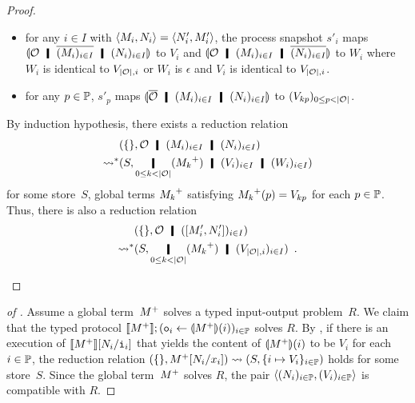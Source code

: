 \begin{proof}
\begin{description}
\begin{itemize}
	   \item
		 for any $i\in I$ with $\langle{M_i,N_i}\rangle = \langle{N'_i,
		 M'_i}\rangle$, the process snapshot
		 $s'_i$ maps
		 $\semoi{\hypert\hmid \overline{(M_i)_{i\in I}}\hmid
		 (N_i)_{i\in I}}$ to $V_i$ and
		 $\semoi{\hypert\hmid (M_i)_{i\in I}\hmid
		 \overline{(N_i)_{i\in I}}}$ to $W_i$ where
		 $W_i$ is identical to $V_{|\mathcal{O}|,i}$ or
		 $W_i$ is $\epsilon$ and $V_i$ is identical to
		 $V_{|\mathcal{O}|,i}$.
	   \item for any $p\in\mathbb{P}$,
		 $s'_p$ maps $\semoi{\overline{\hypert}\hmid (M_i)_{i\in
		 I}\hmid (N_i)_{i\in I}}$ to
		 $(V_{kp})_{0\le p < |\mathcal{O}|}$.
	  \end{itemize}
	  By induction hypothesis, there exists a reduction relation
	  \begin{align*}
	   &\concreteconf{\{\}}{\hypert\hmid (M_i)_{i\in I}\hmid
	   (N_i)_{i\in I}}
	   \\
	   \reduction&\concreteconf{S}{\operatorname*{\hmid}_{0\le k <
	   |\hypert|}
	   (\m{M_k})\hmid (V_i)_{i\in I}\hmid (W_i)_{i\in I}}
	  \end{align*}
	  for some store~$S$, global terms ${M_k}^+$ satisfying
	  ${M_k}^+(p) = V_{kp}$ for each $p\in \mathbb{P}$.
	  Thus, there is also a reduction relation
	  \begin{align*}
	   &\concreteconf{\{\}}{\hypert\hmid (\cotuple{M'_i,N'_i})_{i\in
	   I}}
	   \\
	   \reduction&\concreteconf{S}{\operatorname*{\hmid}_{0\le k <
	   |\hypert|}(\m{M_k})\hmid (V_{|\hypert|,i})_{i\in I}}\enspace.
	  \end{align*}
    \end{description}
   \end{proof}

 \begin{proof}[of ]
  Assume a global term~${M}^+$ solves a typed input-output problem~$R$.
  We claim that the typed protocol
  $\llbracket{{M}^+}\rrbracket; (\texttt{o}_i\leftarrow \llparenthesis{{M}^+}\rrparenthesis(i))_{i\in \mathbb{P}}$
  solves $R$.
  By ,
  if there is an execution of $\llbracket{{M}^+}\rrbracket[N_i / \texttt{i}_i]$ that yields
  the content of $\llparenthesis{{M}^+}\rrparenthesis(i)$ to be $V_i$ for each $i\in
  \mathbb{P}$,
  the reduction relation $({\{\}},{{M}^+[N_i/x_i]})\rightsquigarrow
  ({S},{\{i\mapsto V_i\}_{i\in \mathbb{P}}})$ holds for some
  store~$S$.
  Since the global term~${M}^+$ solves $R$, the pair
  $\langle{(N_i)_{i\in \mathbb{P}}, (V_i)_{i\in\mathbb{P}}}\rangle$ is compatible
  with $R$.
 \end{proof}

